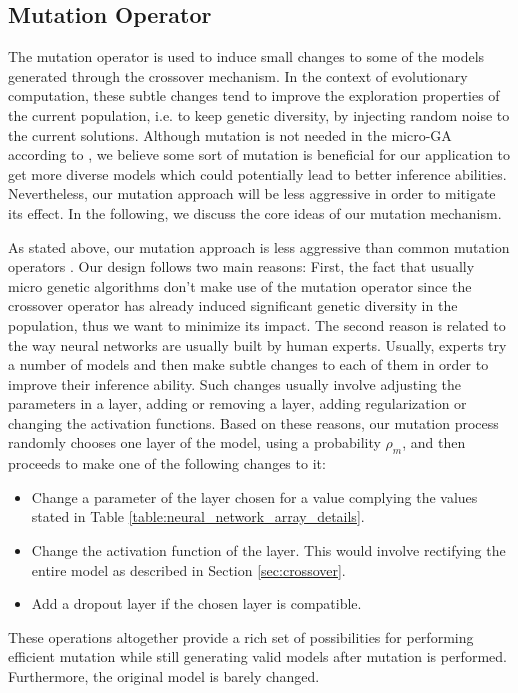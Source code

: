 \documentclass[preprint,12pt]{elsarticle}%
\begin{document}
\subsection{Mutation Operator}
\label{sec:mutation}

The mutation operator is used to induce small changes to some of the models generated through the crossover mechanism. In the context of evolutionary computation, these subtle changes tend to improve the exploration properties of the current population, i.e. to keep genetic diversity, by injecting random noise to the current solutions.  Although mutation is not needed in the micro-GA according to \cite{Krishnakumar1989}, we believe some sort of mutation is beneficial for our application to get more diverse models which could potentially lead to better inference abilities. Nevertheless, our mutation approach will be less aggressive in order to mitigate its effect. In the following, we discuss the core ideas of our mutation mechanism.

As stated above, our mutation approach is less aggressive than common mutation operators \cite{Engelbrecht2007}. Our design follows two main reasons: First, the fact that usually micro genetic algorithms don't make use of the mutation operator since the crossover operator has already induced significant genetic diversity in the population, thus we want to minimize its impact. The second reason is related to the way neural networks are usually built by human experts. Usually, experts try a number of models and then make subtle changes to each of them in order to improve their inference ability. Such changes usually involve adjusting the parameters in a layer, adding or removing a layer, adding regularization or changing the activation functions. Based on these reasons, our mutation process randomly chooses one layer of the model, using a probability $\rho_m$,  and then proceeds to make one of the following changes to it:
\begin{itemize}
\item Change a parameter of the layer chosen for a value complying the values stated in Table \ref{table:neural_network_array_details}.
\item Change the activation function of the layer. This would involve rectifying the entire model as described in Section \ref{sec:crossover}.
\item Add a dropout layer if the chosen layer is compatible.
\end{itemize} 

These operations altogether provide a rich set of possibilities for performing efficient mutation while still generating valid models after mutation is performed. Furthermore, the original model is barely changed.
\end{document}
